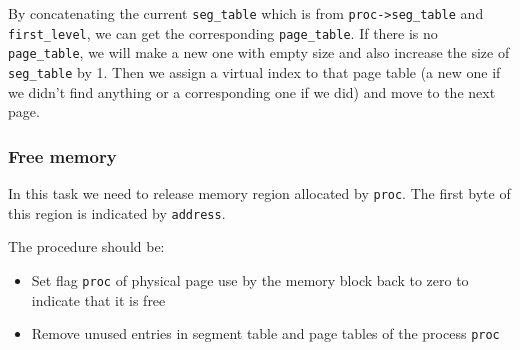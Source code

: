 \documentclass[a4paper]{article}
\numberwithin{equation}{section}
\begin{document}
By concatenating the current \texttt{seg_table} which is from \texttt{proc->seg_table} and \texttt{first_level}, we can get the corresponding \texttt{page_table}.
If there is no \texttt{page_table}, we will make a new one with empty size and also increase the size of \texttt{seg_table} by 1.
Then we assign a virtual index to that page table (a new one if we didn't find anything or a corresponding one if we did) and move to the next page.

\subsubsection{Free memory}
In this task we need to release memory region allocated by \texttt{proc}.
The first byte of this region is indicated by \texttt{address}.

The procedure should be:
\begin{itemize}
  \item  Set flag \texttt{proc} of physical page use by the memory block back to zero to indicate that it is free
  \item Remove unused entries in segment table and page tables of the process \texttt{proc}
\end{itemize}
\end{document}
